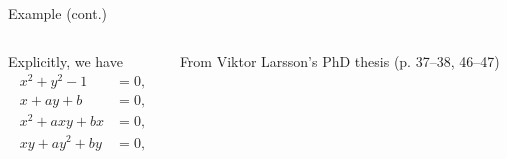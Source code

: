 \documentclass[aspectratio=169]{beamer}
\begin{document}
\begin{frame}[t]{Example (cont.)}
\vspace{1cm}
\begin{columns}
    \begin{column}{0.7\textwidth}
        Explicitly, we have
        \begin{equation*}%
            \begin{aligned}
            x^2 + y^2 -1 & = 0, \\
            x+ay+b & = 0, \\
            x^2+axy+bx & = 0, \\
            xy+ay^2 +by & = 0, \\
            \end{aligned}
        \end{equation*}
    \end{column}%
    \begin{column}{0.3\textwidth}
        \centering
        

        \vspace{5mm}

        {\scriptsize From Viktor Larsson's PhD thesis (p. 37--38, 46--47)}
    \end{column}
\end{columns}
\end{frame}
\end{document}
